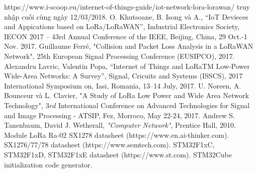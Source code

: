 \thispagestyle{plain}
\begin{thebibliography}{20}
https://www.i-scoop.eu/internet-of-things-guide/iot-network-lora-lorawan/ truy nhập cuối cùng ngày 12/03/2018.
O. Khutsoane, B. Isong và A., “IoT Devieces and Appications based on LoRa/LoRaWAN”, Industrial Electronics Society, IECON 2017 – 43rd Annual Conference of the IEEE, Beijing, China, 29 Oct.-1 Nov. 2017.
Guillaume Ferré, "Collision and Packet Loss Analysis in a LoRaWAN Network", 25th European Signal Processing Conference (EUSIPCO), 2017.
Alexandru Lavric, Valentin Popa, “Internet of Things and LoRaTM Low-Power Wide-Area Networks: A Survey”, Signal, Cricuits and Systems (ISSCS), 2017 International Symposium on, Iasi, Romania, 13–14 July, 2017.
U. Noreen, A. Bounceur và L. Clavier, "A Study of LoRa Low Power and Wide Area Network Technology", 3${rd}$ International Conference on Advanced Technologies for Signal and Image Processing - ATSIP, Fez, Morroco, May 22-24, 2017.
Andrew S. Tanenbaum, David J. Wetherall, \textit{"Computer Network"}, Prentice Hall, 2010.
Module LoRa Ra-02 SX1278 datasheet (https://www.en.ai-thinker.com).
SX1276/77/78 datasheet (https://www.semtech.com).
STM32F1xC, STM32F1xD, STM32F1xE datasheet (https://www.st.com).
STM32Cube initialization code generator.
\end{thebibliography}